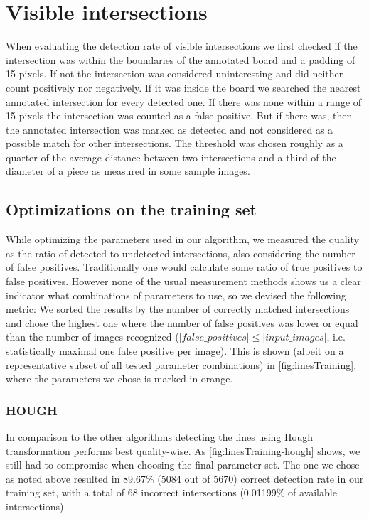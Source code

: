 	\section{Visible intersections}
	\label{evaluation-visible}
	When evaluating the detection rate of visible intersections we first checked if the intersection was within the boundaries of the annotated board and a padding of 15 pixels. If not the intersection was considered uninteresting and did neither count positively nor negatively. If it was inside the board we searched the nearest annotated intersection for every detected one. If there was none within a range of 15 pixels the intersection was counted as a false positive. But if there was, then the annotated intersection was marked as detected and not considered as a possible match for other intersections. The threshold was chosen roughly as a quarter of the average distance between two intersections and a third of the diameter of a piece as measured in some sample images.

	

	\subsection{Optimizations on the training set}
	\label{evaluation-visible-optimization}
	While optimizing the parameters used in our algorithm, we measured the quality as the ratio of detected to undetected intersections, also considering the number of false positives. Traditionally one would calculate some ratio of true positives to false positives. However none of the usual measurement methods shows us a clear indicator what combinations of parameters to use, so we devised the following metric: We sorted the results by the number of correctly matched intersections and chose the highest one where the number of false positives was lower or equal than the number of images recognized ($|false\_positives| \leq |input\_images|$, i.e. statistically maximal one false positive per image). This is shown (albeit on a representative subset of all tested parameter combinations) in \autoref{fig:linesTraining}, where the parameters we chose is marked in orange.

	\subsubsection{HOUGH}
	\label{evaluation-visible-optimization-hough}
	In comparison to the other algorithms detecting the lines using Hough transformation performs best quality-wise. As \autoref{fig:linesTraining-hough} shows, we still had to compromise when choosing the final parameter set. The one we chose as noted above resulted in 89.67\% (5084 out of 5670) correct detection rate in our training set, with a total of 68 incorrect intersections (0.01199\% of available intersections).

